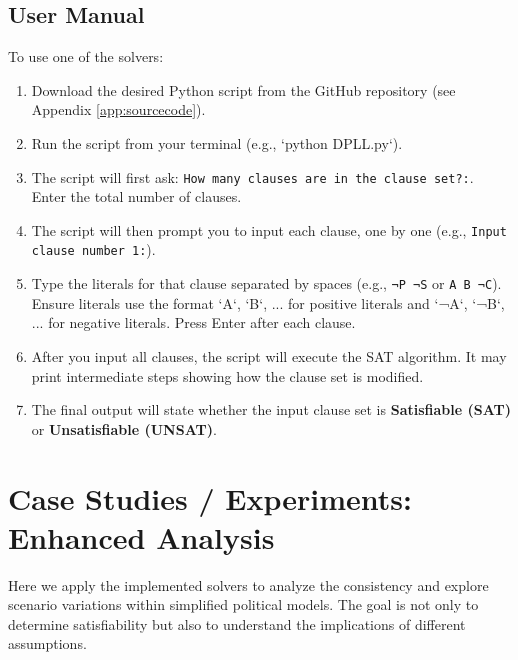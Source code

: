 \documentclass[11pt, a4paper]{article}
\begin{document}
\subsection*{User Manual}
To use one of the solvers:
\begin{enumerate}
    \item Download the desired Python script from the GitHub repository (see Appendix \ref{app:sourcecode}).
    \item Run the script from your terminal (e.g., `python DPLL.py`).
    \item The script will first ask: \texttt{How many clauses are in the clause set?:}. Enter the total number of clauses.
    \item The script will then prompt you to input each clause, one by one (e.g., \texttt{Input clause number 1:}).
    \item Type the literals for that clause separated by spaces (e.g., \texttt{¬P ¬S} or \texttt{A B ¬C}). Ensure literals use the format `A`, `B`, ... for positive literals and `¬A`, `¬B`, ... for negative literals. Press Enter after each clause.
    \item After you input all clauses, the script will execute the SAT algorithm. It may print intermediate steps showing how the clause set is modified.
    \item The final output will state whether the input clause set is \textbf{Satisfiable (SAT)} or \textbf{Unsatisfiable (UNSAT)}.
\end{enumerate}

\section{Case Studies / Experiments: Enhanced Analysis} \label{sec:casestudies}

Here we apply the implemented solvers to analyze the consistency and explore scenario variations within simplified political models. The goal is not only to determine satisfiability but also to understand the implications of different assumptions.
\end{document}
